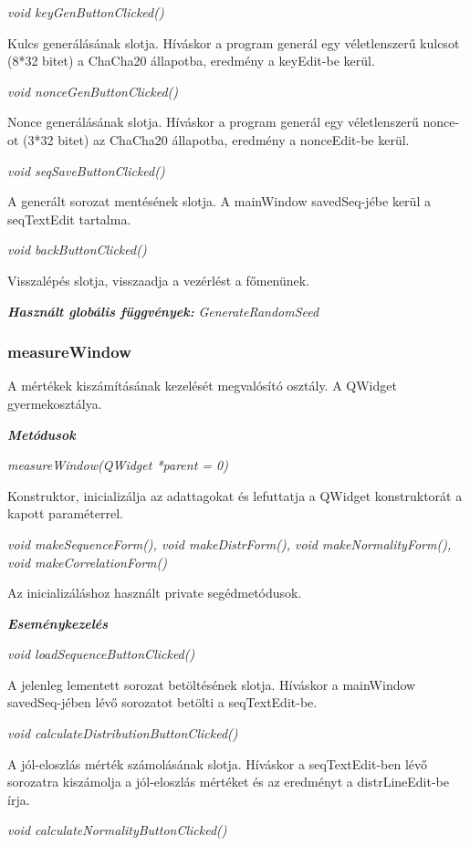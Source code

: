 \documentclass[12pt]{article}
\begin{document}
\textit{void keyGenButtonClicked()}

Kulcs generálásának slotja. Híváskor a program generál egy véletlenszerű kulcsot (8*32 bitet) a ChaCha20 állapotba, eredmény a keyEdit-be kerül.

\textit{void nonceGenButtonClicked()}

Nonce generálásának slotja. Híváskor a program generál egy véletlenszerű nonce-ot (3*32 bitet) az ChaCha20 állapotba, eredmény a nonceEdit-be kerül.

\textit{void seqSaveButtonClicked()}

A generált sorozat mentésének slotja. A mainWindow savedSeq-jébe kerül a seqTextEdit tartalma.

\textit{void backButtonClicked()}

Visszalépés slotja, visszaadja a vezérlést a főmenünek.

\textit{\textbf{Használt globális függvények: }}\textit{GenerateRandomSeed}

\subsubsection*{measureWindow}

A mértékek kiszámításának kezelését megvalósító osztály. A QWidget gyermekosztálya.

\textit{\textbf{Metódusok}}

\textit{measureWindow(QWidget *parent = 0)}

Konstruktor, inicializálja az adattagokat és lefuttatja a QWidget konstruktorát a kapott paraméterrel.

\textit{void makeSequenceForm(), void makeDistrForm(), void makeNormalityForm(), void makeCorrelationForm()}

Az inicializáláshoz használt private segédmetódusok.

\textit{\textbf{Eseménykezelés}}

\textit{void loadSequenceButtonClicked()}

A jelenleg lementett sorozat betöltésének slotja. Híváskor a mainWindow savedSeq-jében lévő sorozatot betölti a seqTextEdit-be.

\textit{void calculateDistributionButtonClicked()}

A jól-eloszlás mérték számolásának slotja. Híváskor a seqTextEdit-ben lévő sorozatra kiszámolja a jól-eloszlás mértéket és az eredményt a distrLineEdit-be írja.

\textit{void calculateNormalityButtonClicked()}
\end{document}
